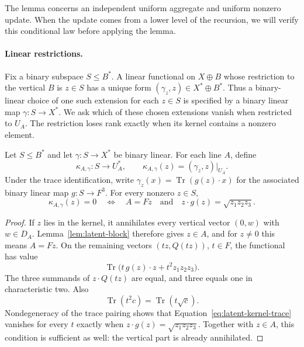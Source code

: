 The lemma concerns an independent uniform aggregate and uniform nonzero
update.  When the update comes from a lower level of the recursion, we will
verify this conditional law before applying the lemma.

\paragraph{Linear restrictions.}
Fix a binary subspace $S\le B^*$.  A linear functional on $X\oplus B$
whose restriction to the vertical $B$ is $z\in S$ has a unique form
$(\gamma_z,z)\in X^*\oplus B^*$.  Thus a binary-linear choice of one such
extension for each $z\in S$ is specified by a binary linear map
$\gamma:S\to X^*$.  We ask which of these chosen extensions vanish when
restricted to $U_A$.  The restriction loses rank exactly when its kernel
contains a nonzero element.

\begin{lemma}\label{lem:latent-block-kernel}
Let $S\le B^*$ and let $\gamma:S\to X^*$ be binary linear.  For each line
$A$, define
\[
 \kappa_{A,\gamma}:S\longrightarrow U_A^*,
 \qquad \kappa_{A,\gamma}(z)=(\gamma_z,z)|_{U_A}.
\]
Under the trace identification, write
$\gamma_z(x)=\operatorname{Tr}(g(z)\cdot x)$ for the associated binary
linear map $g:S\to F^3$.  For every nonzero $z\in S$,
\[
 \kappa_{A,\gamma}(z)=0
 \quad\Longleftrightarrow\quad
 A=Fz
 \quad\text{and}\quad
 z\cdot g(z)=\sqrt{z_1z_2z_3}.
\]
\end{lemma}

\begin{proof}
If $z$ lies in the kernel, it annihilates every vertical vector
$(0,w)$ with $w\in D_A$.  Lemma~\ref{lem:latent-block} therefore gives
$z\in A$, and for $z\ne0$ this means $A=Fz$.  On the remaining vectors
$(tz,Q(tz))$, $t\in F$, the functional has value
\begin{equation}\label{eq:latent-kernel-trace}
 \operatorname{Tr}\bigl(t\,g(z)\cdot z+t^2z_1z_2z_3\bigr).
\end{equation}
The three summands of $z\cdot Q(tz)$ are equal, and three equals one in
characteristic two.  Also
\[
 \operatorname{Tr}(t^2c)=\operatorname{Tr}(t\sqrt c).
\]
Nondegeneracy of the trace pairing shows that
Equation~\eqref{eq:latent-kernel-trace} vanishes for every $t$ exactly when
$z\cdot g(z)=\sqrt{z_1z_2z_3}$.  Together with $z\in A$, this condition
is sufficient as well: the vertical part is already annihilated.
\end{proof}

